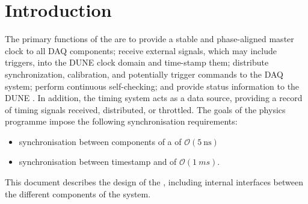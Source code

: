 \documentclass[main.tex]{subfiles}
\begin{document}
\section{Introduction}
\label{sec:intro}
The primary functions of the  are to provide a stable and phase-aligned master clock to all DAQ components; receive external signals, which may include triggers, into the DUNE clock domain and time-stamp them; distribute synchronization, calibration, and potentially trigger commands to the DAQ system; perform continuous self-checking; and provide status information to the DUNE . In addition, the timing system acts as a data source, providing a record of timing signals received, distributed, or throttled. The goals of the  physics programme impose the following synchronisation requirements:

\begin{itemize}
    \item synchronisation between components of a  of $\mathcal{O}(\SI{5}{\ns})$
    \item synchronisation between  timestamp and  of $\mathcal{O}(\SI{1}{ms})$.
\end{itemize}


This document describes the design of the , including internal interfaces between the different components of the system. 

\end{document}

